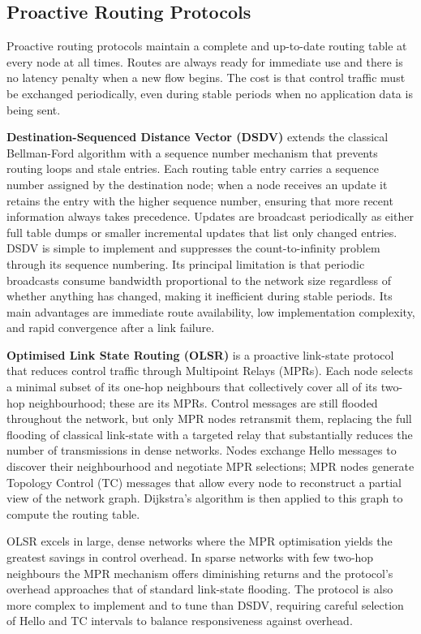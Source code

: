 \subsection{Proactive Routing Protocols}

Proactive routing protocols maintain a complete and up-to-date routing table at every node at
all times. Routes are always ready for immediate use and there is no latency penalty when a new
flow begins. The cost is that control traffic must be exchanged periodically, even during stable
periods when no application data is being sent.

\textbf{Destination-Sequenced Distance Vector (DSDV)} extends the classical Bellman-Ford
algorithm with a sequence number mechanism that prevents routing loops and stale entries.
Each routing table entry carries a sequence number assigned by the destination node; when a
node receives an update it retains the entry with the higher sequence number, ensuring that
more recent information always takes precedence. Updates are broadcast periodically as either
full table dumps or smaller incremental updates that list only changed entries. DSDV is simple
to implement and suppresses the count-to-infinity problem through its sequence numbering.
Its principal limitation is that periodic broadcasts consume bandwidth proportional to the
network size regardless of whether anything has changed, making it inefficient during stable
periods. Its main advantages are immediate route availability, low implementation complexity,
and rapid convergence after a link failure.

\textbf{Optimised Link State Routing (OLSR)} is a proactive link-state protocol that reduces
control traffic through Multipoint Relays (MPRs). Each node selects a minimal subset of its
one-hop neighbours that collectively cover all of its two-hop neighbourhood; these are its
MPRs. Control messages are still flooded throughout the network, but only MPR nodes
retransmit them, replacing the full flooding of classical link-state with a targeted relay that
substantially reduces the number of transmissions in dense networks. Nodes exchange Hello
messages to discover their neighbourhood and negotiate MPR selections; MPR nodes generate
Topology Control (TC) messages that allow every node to reconstruct a partial view of the
network graph. Dijkstra's algorithm is then applied to this graph to compute the routing table.

OLSR excels in large, dense networks where the MPR optimisation yields the greatest savings
in control overhead. In sparse networks with few two-hop neighbours the MPR mechanism
offers diminishing returns and the protocol's overhead approaches that of standard link-state
flooding. The protocol is also more complex to implement and to tune than DSDV, requiring
careful selection of Hello and TC intervals to balance responsiveness against overhead.

